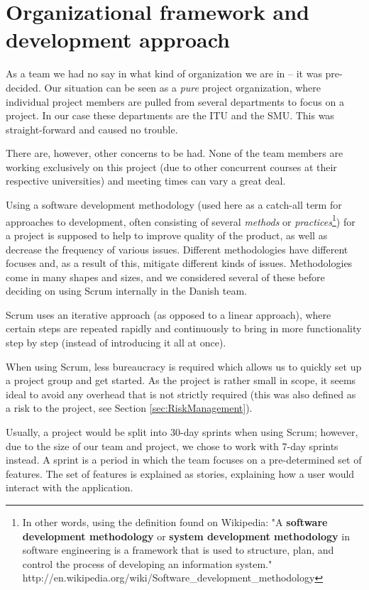 \section{Organizational framework and development approach}
\label{sec:organizational}

As a team we had no say in what kind of organization we are in – it was pre-decided. Our
situation can be seen as a \emph{pure} project organization\cite{caye}, where individual project members are
pulled from several departments to focus on a project. In our case these departments are the
ITU and the SMU. This was straight-forward and caused no trouble.

There are, however, other concerns to be had. None of the team members are working exclusively
on this project (due to other concurrent courses at their respective universities) and meeting
times can vary a great deal.


Using a software development methodology (used here as a catch-all term for approaches to
development, often consisting of several \emph{methods} or \emph{practices}\footnote{In other
words, using the definition found on Wikipedia: "A \textbf{software development methodology}
or \textbf{system development methodology} in software engineering is a framework that is used
to structure, plan, and control the process of developing an information system."
http://en.wikipedia.org/wiki/Software_development_methodology}) for a project is supposed to help to
improve quality of the product, as well as decrease the frequency of various issues. Different
methodologies have different focuses and, as a result of this, mitigate different kinds of issues.
Methodologies come in many shapes and sizes, and we considered several of these before deciding
on using Scrum internally in the Danish team.

Scrum uses an iterative approach (as opposed to a linear approach), where certain steps are
repeated rapidly and continuously to bring in more functionality step by step (instead of
introducing it all at once).

When using Scrum, less bureaucracy is required\cite{caye} which allows us to quickly set up a project
group and get started. As the project is rather small in scope, it seems ideal to avoid any overhead
that is not strictly required (this was also defined as a risk to the project, see Section \ref{sec:RiskManagement}).

Usually, a project would be split into 30-day sprints when using Scrum; however, due to the size of
our team and project, we chose to work with 7-day sprints instead. A sprint is a period in which the
team focuses on a pre-determined set of features. The set of features is explained as stories,
explaining how a user would interact with the application.

